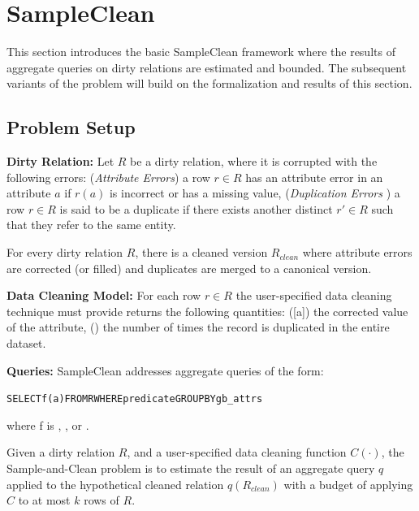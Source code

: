 \section{SampleClean \cite{wang1999sample}}
This section introduces the basic SampleClean framework where the results of aggregate queries on dirty relations are estimated and bounded. The subsequent variants of the problem will build on the formalization and results of this section.

\subsection{Problem Setup}

\noindent \textbf{Dirty Relation: } Let $R$ be a dirty relation, where it is corrupted with the following errors: (\emph{Attribute Errors}) a row $r\in R$ has an attribute error in an attribute $a$ if $r(a)$ is incorrect or has a missing value,  (\emph{Duplication Errors} ) a row $r \in R$ is said to be a duplicate if there exists another distinct $r' \in R$ such that they refer to the same entity.

\vspace{.25em}

\noindent For every dirty relation $R$, there is a cleaned version $R_{clean}$ where attribute errors are corrected (or filled) and duplicates are merged to a canonical version. 

\vspace{.25em}

\noindent\textbf{Data Cleaning Model: } 
For each row $r \in R$ the user-specified data cleaning technique must provide returns the following quantities: ([a]) the corrected value of the attribute, () the number of times the record is duplicated in the entire dataset.

\vspace{.25em}

\noindent\textbf{Queries: } SampleClean addresses aggregate queries of the form:
\begin{alltt}
SELECT \textsf{f}(a) FROM R WHERE predicate GROUP BY gb_attrs
\end{alltt}
where f is \avgfunc, \sumfunc, or \countfunc. 

\vspace{.25em}

\begin{problem}
Given a dirty relation $R$, and a user-specified data cleaning function $C(\cdot)$, the Sample-and-Clean problem is to estimate the result of an aggregate query $q$ applied to the hypothetical cleaned relation $q(R_{clean})$ with a budget of applying $C$ to at most $k$ rows of $R$. 
\end{problem}

